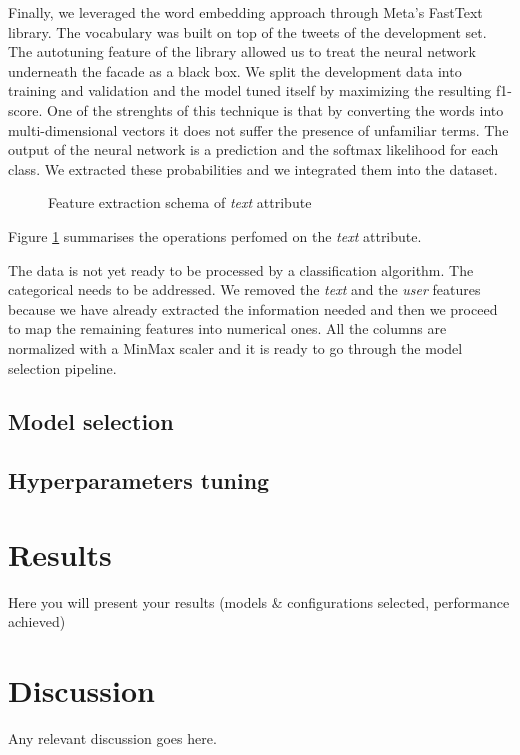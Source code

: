 \documentclass[conference]{IEEEtran}
\begin{document}
Finally, we leveraged the word embedding approach through Meta's FastText library. The vocabulary was built on top of the tweets of the development set. The autotuning feature of the library allowed us to treat the neural network underneath the facade as a black box. We split the development data into training and validation and the model tuned itself by maximizing the resulting f1-score. One of the strenghts of this technique is that by converting the words into multi-dimensional vectors it does not suffer the presence of unfamiliar terms. The output of the neural network is a prediction and the softmax likelihood for each class. We extracted these probabilities and we integrated them into the dataset.
\begin{figure}[h]
        \centering
        
        \caption{Feature extraction schema of \textit{text} attribute}
        \label{fig:text_schema}
\end{figure}
Figure \ref{fig:text_schema} summarises the operations perfomed on the \textit{text} attribute.

The data is not yet ready to be processed by a classification algorithm. The categorical needs to be addressed. We removed the \textit{text} and the \textit{user} features because we have already extracted the information needed and then we proceed to map the remaining features into numerical ones. All the columns are normalized with a MinMax scaler\cite{minmax} and it is ready to go through the model selection pipeline.
\subsection{Model selection}\label{sec:model}

\subsection{Hyperparameters tuning}\label{sec:hypertuning}

\section{Results}\label{sec:results}
Here you will present your results (models \& configurations selected, performance achieved)

\section{Discussion}\label{sec:discussion}
Any relevant discussion goes here.



\end{document}
